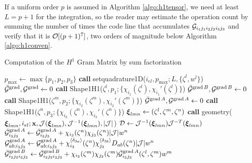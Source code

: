If a uniform order $p$ is assumed in Algorithm \ref{algo:h1tensor}, we need at least $L=p+1$ for the integration, so the reader may estimate the operation count by summing the number of times the code line that accumulates $\mathcal{G}_{i_1j_1i_2j_2i_3j_3}$ and verify that it is $\mathcal{O}[(p+1)^7]$, two orders of magnitude below Algorithm \ref{algo:h1conven}.
% 
\begin{algorithm}[ht!]
\caption{Computation of the $H^1$ Gram Matrix by sum factorization}\label{algo:h1tensor}
\begin{algorithmic}
\State $p_{\max}\gets\max\{p_1,p_2,p_3\}$
\State\textbf{call }setquadrature1D($i_{el},p_{\max};L,\{\zeta^l,w^l\}$)
\State $\bar{\mathcal{G}}^{\operatorname{grad}},\mathcal{G}^{\operatorname{grad}}\gets 0$
    \State\textbf{call } Shape1H1($\zeta^l,p_1;\{\chi_{i_1}(\zeta^l),\chi_{i_1}'(\zeta^l)\}$) 
            \State $\bar{\mathcal{G}}^{\operatorname{grad} B},\mathcal{G}^{\operatorname{grad} B}\gets 0$
                \State\textbf{call } Shape1H1($\zeta^m,p_2;\{\chi_{i_2}(\zeta^m),\chi_{i_2}'(\zeta^m)\}$) 
                \State $\bar{\mathcal{G}}^{\operatorname{grad} A},\mathcal{G}^{\operatorname{grad} A}\gets 0$
                    \State\textbf{call } Shape1H1($\zeta^n,p_3;\{\chi_{i_3}(\zeta^n),\chi_{i_3}'(\zeta^n)\}$) 
                    \State $\boldsymbol{\xi}_{lmn}\gets (\zeta^l,\zeta^m,\zeta^n)$
                    \State\textbf{call } geometry( $\boldsymbol{\xi}_{lmn},i_{el};\mathbf{x},\mathcal{J}(\boldsymbol{\xi}_{lmn}),\mathcal{J}^{-1}(\boldsymbol{\xi}_{lmn}),|\mathcal{J}|$)
                    \State $\mathcal{D}\gets\mathcal{J}^{-1}(\boldsymbol{\xi}_{lmn})\mathcal{J}^{-T}(\boldsymbol{\xi}_{lmn})$
                    \State$\bar{\mathcal{G}}_{i_3j_3}^{\operatorname{grad} A}\gets \bar{\mathcal{G}}_{i_3j_3}^{\operatorname{grad} A}+ \chi_{i_3}(\zeta^n)\chi_{j_3}(\zeta^n)|\mathcal{J}|w^n$ 
                        \State$\mathcal{G}_{ab;i_3j_3}^{\operatorname{grad} A}\gets \mathcal{G}_{ab;i_3j_3}^{\operatorname{grad} A}+ \chi_{i_3}^{\langle\delta_{3a}\rangle}(\zeta^n)\chi_{j_3}^{\langle\delta_{3b}\rangle}D_{ab}(\zeta^n)|\mathcal{J}|w^n$                         
                    \EndFor                    
                \EndFor
                    \State$\bar{\mathcal{G}}_{i_2j_2i_3j_3}^{\operatorname{grad} B}\gets \bar{\mathcal{G}}_{i_2j_2i_3j_3}^{\operatorname{grad} B}+ \chi_{i_2}(\zeta^m)\chi_{j_2}(\zeta^m)\bar{\mathcal{G}}_{i_3j_3}^{\operatorname{grad} A}(\zeta^l,\zeta^m)w^m$ 

\end{algorithmic}
\end{algorithm}
